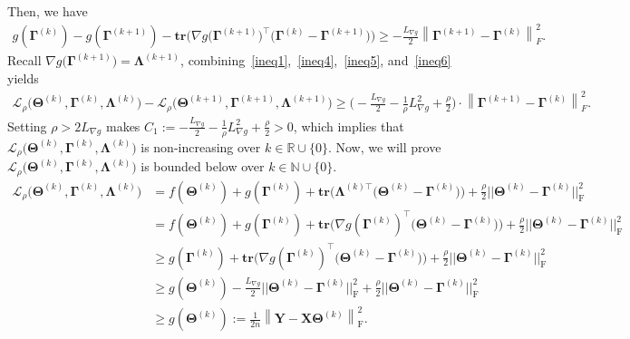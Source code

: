 \documentclass[alpha-refs]{wiley-article}
\begin{document}
Then, we have 
\begin{align} \label{ineq6}
    g(\boldsymbol{\Gamma}^{(k)}) - g(\boldsymbol{\Gamma}^{(k+1)})
    - \textbf{tr}\bigg(\nabla g\big(\boldsymbol{\Gamma}^{(k+1)}\big)^\top
    \big(\boldsymbol{\Gamma}^{(k)}-\boldsymbol{\Gamma}^{(k+1)}\big)\bigg) \geq -\frac{L_{\nabla g}}{2}
    \left\| \boldsymbol{\Gamma}^{(k+1)} - \boldsymbol{\Gamma}^{(k)} \right\|_{F}^{2}.
\end{align}
Recall $\nabla g\big( \boldsymbol{\Gamma}^{(k+1)} \big) = \boldsymbol{\Lambda}^{(k+1)}$, combining~\eqref{ineq1},~\eqref{ineq4},~\eqref{ineq5}, and~\eqref{ineq6} yields 
\begin{align*}
    \mathcal{L}_{\rho} \big( \boldsymbol{\Theta}^{(k)},\boldsymbol{\Gamma}^{(k)},\boldsymbol{\Lambda}^{(k)} \big) 
    - \mathcal{L}_{\rho} \big( \boldsymbol{\Theta}^{(k+1)},\boldsymbol{\Gamma}^{(k+1)},\boldsymbol{\Lambda}^{(k+1)} \big)
    \geq \bigg(  -\frac{L_{\nabla g}}{2} -\frac{1}{\rho} L_{\nabla g}^{2} + \frac{\rho}{2} \bigg) \cdot 
    \left\| \boldsymbol{\Gamma}^{(k+1)} - \boldsymbol{\Gamma}^{(k)} \right\|_{F}^{2}.
\end{align*}
Setting $\rho>2L_{\nabla g}$ makes $C_{1}:=-\frac{L_{\nabla g}}{2} -\frac{1}{\rho} L_{\nabla g}^{2} + \frac{\rho}{2}>0$, which implies that $\mathcal{L}_{\rho}\big( \boldsymbol{\Theta}^{(k)},\boldsymbol{\Gamma}^{(k)},\boldsymbol{\Lambda}^{(k)} \big)$ is non-increasing over $k\in\mathbb{R}\cup \{0\}$.
Now, we will prove $ \mathcal{L}_{\rho}\big(\boldsymbol{\Theta}^{(k)},\boldsymbol{\Gamma}^{(k)},\boldsymbol{\Lambda}^{(k)}\big)$ is bounded below over $k\in\mathbb{N}\cup\{0\}$.
\begin{align*}
    \mathcal{L}_{\rho}\big(\boldsymbol{\Theta}^{(k)},\boldsymbol{\Gamma}^{(k)},\boldsymbol{\Lambda}^{(k)}\big)
    &= f(\boldsymbol{\Theta}^{(k)}) + g(\boldsymbol{\Gamma}^{(k)}) + \textbf{tr}\big( \boldsymbol{\Lambda}^{(k)\top}\big( \boldsymbol{\Theta}^{(k)} - \boldsymbol{\Gamma}^{(k)} \big)\big)
    + \frac{\rho}{2} || \boldsymbol{\Theta}^{(k)}-\boldsymbol{\Gamma}^{(k)} ||_{\text{F}}^{2} \\
    &= f(\boldsymbol{\Theta}^{(k)}) + g(\boldsymbol{\Gamma}^{(k)}) + \textbf{tr}\big( \nabla g(\boldsymbol{\Gamma}^{(k)})^\top\big( \boldsymbol{\Theta}^{(k)} - \boldsymbol{\Gamma}^{(k)} \big)\big)
    + \frac{\rho}{2} || \boldsymbol{\Theta}^{(k)}-\boldsymbol{\Gamma}^{(k)} ||_{\text{F}}^{2} \\
    &\geq g(\boldsymbol{\Gamma}^{(k)}) + \textbf{tr}\big( \nabla g(\boldsymbol{\Gamma}^{(k)})^\top\big( \boldsymbol{\Theta}^{(k)} - \boldsymbol{\Gamma}^{(k)} \big)\big)
    + \frac{\rho}{2} || \boldsymbol{\Theta}^{(k)}-\boldsymbol{\Gamma}^{(k)} ||_{\text{F}}^{2} \\
    &\geq g(\boldsymbol{\Theta}^{(k)}) -\frac{L_{\nabla g}}{2}|| \boldsymbol{\Theta}^{(k)}-\boldsymbol{\Gamma}^{(k)} ||_{\text{F}}^{2} + \frac{\rho}{2} || \boldsymbol{\Theta}^{(k)}-\boldsymbol{\Gamma}^{(k)} ||_{\text{F}}^{2} \\
    &\geq g(\boldsymbol{\Theta}^{(k)})
    :=\frac{1}{2n}\left\|\boldsymbol{Y}-\boldsymbol{X\Theta}^{(k)}\right\|_{\text{F}}^{2}.
\end{align*}
\end{document}
